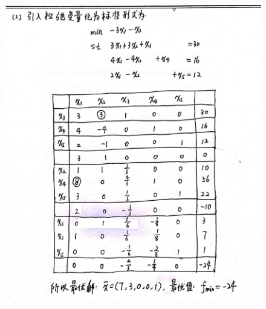 \documentclass[a4paper]{article}
\begin{document}
\begin{figure}[htbp]
	\centering
	\includegraphics[height=18cm]{img_0335.jpg}
\end{figure}
\end{document}
